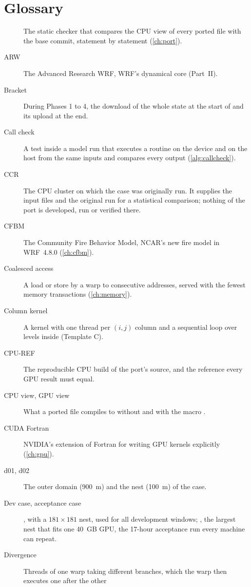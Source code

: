 \chapter{Glossary}\label{app:glossary}

\begin{description}
  \item[] The static checker that compares the CPU view of every ported file with the base commit,
    statement by statement (\cref{ch:port}).
  \item[ARW] The Advanced Research WRF, WRF's dynamical core (Part~II).
  \item[Bracket] During Phases 1 to 4, the download of the whole state at the start of  and its
    upload at the end.
  \item[Call check] A test inside a model run that executes a routine on the device and on the host from the same
    inputs and compares every output (\cref{alg:callcheck}).
  \item[CCR] The CPU cluster on which the case was originally run. It supplies the input files and the original run
    for a statistical comparison; nothing of the port is developed, run or verified there.
  \item[CFBM] The Community Fire Behavior Model, NCAR's new fire model in WRF~4.8.0 (\cref{ch:cfbm}).
  \item[Coalesced access] A load or store by a warp to consecutive addresses, served with the fewest memory
    transactions (\cref{ch:memory}).
  \item[Column kernel] A kernel with one thread per $(i,j)$ column and a sequential loop over levels inside
    (Template C).
  \item[CPU-REF] The reproducible CPU build of the port's source, and the reference every GPU result must equal.
  \item[CPU view, GPU view] What a ported file compiles to without and with the macro .
  \item[CUDA Fortran] NVIDIA's extension of Fortran for writing GPU kernels explicitly (\cref{ch:gpu}).
  \item[d01, d02] The outer domain (900~m) and the nest (100~m) of the case.
  \item[Dev case, acceptance case] , with a $181 \times 181$ nest, used for all development
    windows; , the largest nest that fits one 40~GB GPU, the 17-hour acceptance run every machine
    can repeat.
  \item[Divergence] Threads of one warp taking different branches, which the warp then executes one after the other

\end{description}
